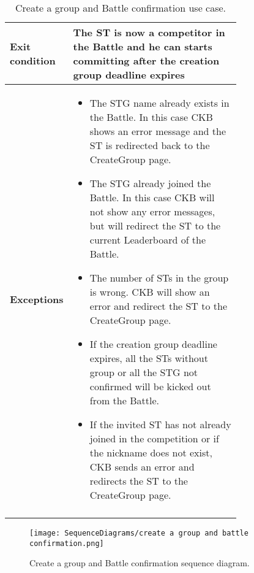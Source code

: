 \begin{center}
\begin{longtable}{|l|p{0.75\linewidth}|}
        \hline
        \textbf{Exit condition}   & The ST is now a competitor in the Battle and he can starts committing after the creation group deadline expires        \\
        \hline
        \textbf{Exceptions}        & \begin{itemize}
            \item The STG name already exists in the Battle. In this case CKB shows an error message and the ST is redirected back to the CreateGroup page.
            \item The STG already joined the Battle. In this case CKB will not show any error messages, but will redirect the ST to the current Leaderboard of the Battle.
            \item The number of STs in the group is wrong. CKB will show an error and redirect the ST to the CreateGroup page.
            \item If the creation group deadline expires, all the STs without group or all the STG not confirmed will be kicked out from the Battle.
            \item If the invited ST has not already joined in the competition or if the nickname does not exist, CKB sends an error and redirects the ST to the CreateGroup page.
         \end{itemize}  \\
        \hline
        \caption{Create a group and Battle confirmation use case.}
        \label{tab: create_a_group_and_Battle_confirmation_use_case}
    \end{longtable}
\end{center}

\begin{figure}[H]
    \begin{center}
        \texttt{[image: SequenceDiagrams/create a group and battle confirmation.png]}
        \caption{Create a group and Battle confirmation sequence diagram.}
        \label{fig:create_a_group_and_battle_confirmation_seqd}%
    \end{center}
\end{figure}

